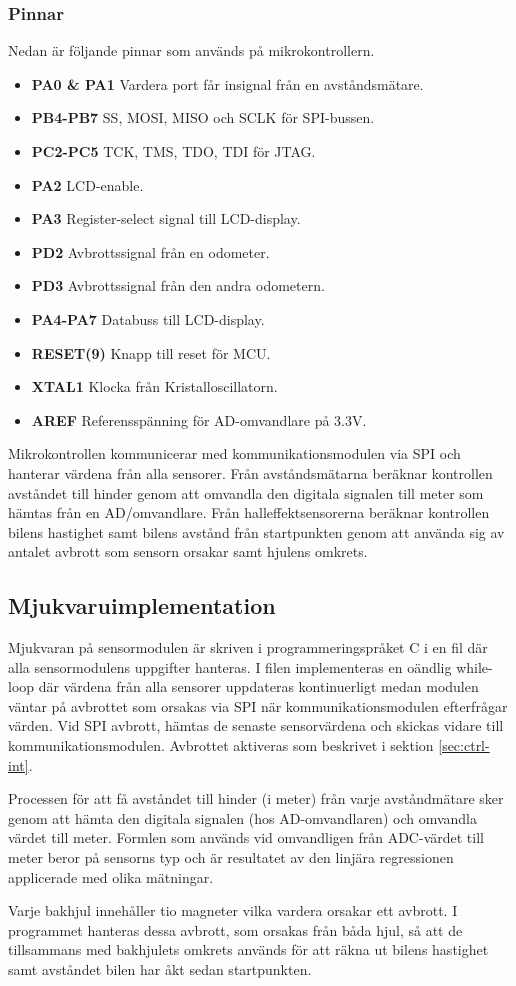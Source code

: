 \documentclass[tekniskrapport/tech.tex]{subfiles}
\begin{document}
\subsubsection{Pinnar}
Nedan är följande pinnar som används på mikrokontrollern.
\begin{itemize}
   \item \textbf{PA0 \& PA1} Vardera port får insignal från en avståndsmätare.
   \item \textbf{PB4-PB7} SS, MOSI, MISO och SCLK för SPI-bussen.
   \item \textbf{PC2-PC5} TCK, TMS, TDO, TDI för JTAG.
   \item \textbf{PA2} LCD-enable.
   \item \textbf{PA3} Register-select signal till LCD-display.
   \item \textbf{PD2} Avbrottssignal från en odometer.
   \item \textbf{PD3} Avbrottssignal från den andra odometern.
   \item \textbf{PA4-PA7} Databuss till LCD-display.
   \item \textbf{RESET(9)} Knapp till reset för MCU.
   \item \textbf{XTAL1} Klocka från Kristalloscillatorn. 
   \item \textbf{AREF} Referensspänning för AD-omvandlare på 3.3V.

\end{itemize}
Mikrokontrollen kommunicerar med kommunikationsmodulen via SPI och hanterar
värdena från alla sensorer. Från avståndsmätarna beräknar kontrollen avståndet
till hinder genom att omvandla den digitala signalen till meter som hämtas från
en AD/omvandlare. Från halleffektsensorerna beräknar kontrollen bilens
hastighet samt bilens avstånd från startpunkten genom att använda sig av
antalet avbrott som sensorn orsakar samt hjulens omkrets.

\subsection{Mjukvaruimplementation} 
Mjukvaran på sensormodulen är skriven i programmeringspråket C i en fil där
alla sensormodulens uppgifter hanteras. I filen implementeras en oändlig
while-loop där värdena från alla sensorer uppdateras kontinuerligt medan
modulen väntar på avbrottet som orsakas via SPI när kommunikationsmodulen
efterfrågar värden. Vid SPI avbrott, hämtas de senaste sensorvärdena och
skickas vidare till kommunikationsmodulen. Avbrottet aktiveras som beskrivet i
sektion \ref{sec:ctrl-int}.

Processen för att få avståndet till hinder (i meter) från varje avståndmätare
sker genom att hämta den digitala signalen (hos AD-omvandlaren) och omvandla
värdet till meter. Formlen som används vid omvandligen från ADC-värdet till
meter beror på sensorns typ och är resultatet av den linjära regressionen
applicerade med olika mätningar.

Varje bakhjul innehåller tio magneter vilka vardera orsakar ett avbrott. I
programmet hanteras dessa avbrott, som orsakas från båda hjul, så att de
tillsammans med bakhjulets omkrets används för att räkna ut bilens hastighet
samt avståndet bilen har åkt sedan startpunkten.
\end{document}

